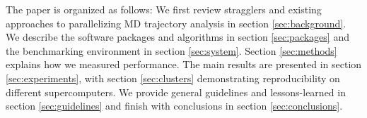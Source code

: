 The paper is organized as follows:
We first review stragglers and existing approaches to parallelizing MD trajectory analysis in section \ref{sec:background}.
We describe the software packages and algorithms in section \ref{sec:packages} and the benchmarking environment in section \ref{sec:system}.
Section \ref{sec:methods} explains how we measured performance.
The main results are presented in section \ref{sec:experiments}, with section \ref{sec:clusters} demonstrating reproducibility on different supercomputers.
We provide general guidelines and lessons-learned in section \ref{sec:guidelines} and finish with conclusions in section \ref{sec:conclusions}.

